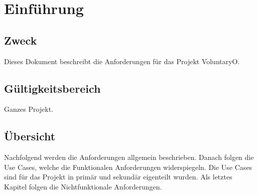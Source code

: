 \chapter{Einführung}
	\section{Zweck}
	Dieses Dokument beschreibt die Anforderungen für das Projekt VoluntaryO.
	
	\section{Gültigkeitsbereich}
	Ganzes Projekt.
	
	\section{Übersicht}
	Nachfolgend werden die Anforderungen allgemein beschrieben. Danach folgen die Use Cases, welche die Funktionalen Anforderungen widerspiegeln. Die Use Cases sind für das Projekt in primär und sekundär eigenteilt wurden. 
	Als letztes Kapitel folgen die Nichtfunktionale Anforderungen.
